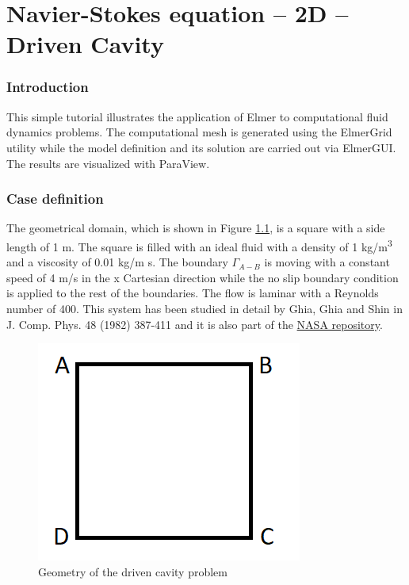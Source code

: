 \chapter{Navier-Stokes equation -- 2D -- Driven Cavity}



\subsection*{Introduction}

This simple tutorial illustrates the application of Elmer to computational fluid dynamics problems.
The computational mesh is generated using the ElmerGrid utility while the model definition and its solution are carried out via ElmerGUI. The results are visualized with ParaView.

\subsection*{Case definition}

The geometrical domain, which is shown in Figure \ref{fg:DC_geometry}, is a square with a side length of 1 m. The square is filled with an ideal fluid with a density of 1 kg/m\textsuperscript{3} and a viscosity of 0.01 kg/m s. The boundary $\Gamma_{A-B}$ is moving with a constant speed of 4 m/s in the x Cartesian direction while the no slip boundary condition is applied to the rest of the boundaries. The flow is laminar with a Reynolds number of 400. This system has been studied in detail by Ghia, Ghia and Shin in J. Comp. Phys. 48 (1982) 387-411 and it is also part of the  \href{https://www.grc.nasa.gov/WWW/wind/valid/cavity/cavity.html}{NASA repository}.

\begin{figure}[H]
\centering
\includegraphics[scale=0.7]{DC_geometry}
\caption{Geometry of the driven cavity problem}\label{fg:DC_geometry}
\end{figure}  

